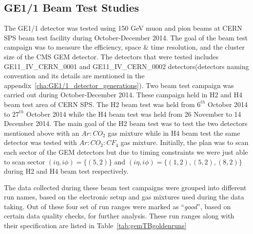 
\subsection{GE1/1 Beam Test Studies}
The GE1/1 detector was tested using 150 GeV muon and pion beams at CERN SPS beam test facility during October-December 2014. 
The goal of the beam test campaign was to measure the efficiency, space \& time resolution, and the cluster size of the CMS GEM detector. 
The detectors that were tested includes GE11\_IV\_CERN\_0001 and GE11\_IV\_CERN\_0002 detectors(detectors naming convention and its details are mentioned in the appendix~\ref{cha:GE1/1_detector_generations}).
Two beam test campaign was carried out during October-December 2014.
These campaign held in H2 and H4 beam test area of CERN SPS.
The H2 beam test was held from $6^{th}$ October 2014 to $27^{th}$ October 2014 while the H4 beam test was held from 26 November to 14 December 2014.
The main goal of the H2 beam test was to test the two detectors mentioned above with an $Ar:CO_2$ gas mixture while in H4 beam test the same detector was tested with $Ar:CO_2:CF_4$ gas mixture.
Initially, the plan was to scan each sector of the GEM detectors but due to timing constraints we were just able to scan sector $(i\eta, i\phi)=\{(5,2)\}$ and $(i\eta,i\phi)=\{(1,2),(5,2),(8,2)\}$ during H2 and H4 beam test respectively.  

The data collected during these beam test campaigns were grouped into different run names, based on the electronic setup and gas mixtures used during the data taking. Out of these four set of run ranges were marked as ``\textit{good}'', based on certain data quality checks, for further analysis. These run ranges along with their specification are listed in Table~\ref{tab:gemTBgoldenruns}

